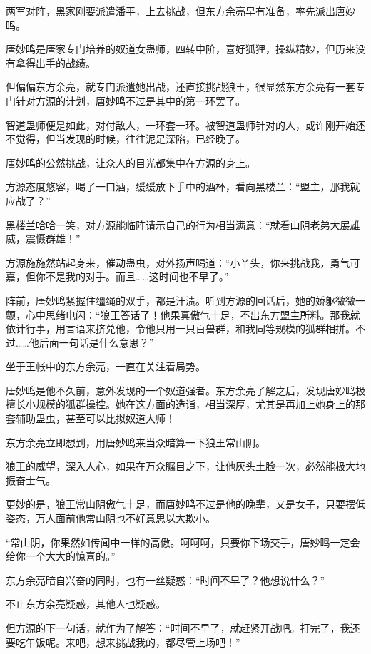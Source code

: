 
\begin{this_body}

两军对阵，黑家刚要派遣潘平，上去挑战，但东方余亮早有准备，率先派出唐妙鸣。

唐妙鸣是唐家专门培养的奴道女蛊师，四转中阶，喜好狐狸，操纵精妙，但历来没有拿得出手的战绩。

但偏偏东方余亮，就专门派遣她出战，还直接挑战狼王，很显然东方余亮有一套专门针对方源的计划，唐妙鸣不过是其中的第一环罢了。

智道蛊师便是如此，对付敌人，一环套一环。被智道蛊师针对的人，或许刚开始还不觉得，但当发现的时候，往往泥足深陷，已经晚了。

唐妙鸣的公然挑战，让众人的目光都集中在方源的身上。

方源态度悠容，喝了一口酒，缓缓放下手中的酒杯，看向黑楼兰：“盟主，那我就应战了？”

黑楼兰哈哈一笑，对方源能临阵请示自己的行为相当满意：“就看山阴老弟大展雄威，震慑群雄！”

方源施施然站起身来，催动蛊虫，对外扬声喝道：“小丫头，你来挑战我，勇气可嘉，但你不是我的对手。而且……这时间也不早了。”

阵前，唐妙鸣紧握住缰绳的双手，都是汗渍。听到方源的回话后，她的娇躯微微一颤，心中思绪电闪：“狼王答话了！他果真傲气十足，不出东方盟主所料。那我就依计行事，用言语来挤兑他，令他只用一只百兽群，和我同等规模的狐群相拼。不过……他后面一句话是什么意思？”

坐于王帐中的东方余亮，一直在关注着局势。

唐妙鸣是他不久前，意外发现的一个奴道强者。东方余亮了解之后，发现唐妙鸣极擅长小规模的狐群操控。她在这方面的造诣，相当深厚，尤其是再加上她身上的那套辅助蛊虫，甚至可以比拟奴道大师！

东方余亮立即想到，用唐妙鸣来当众暗算一下狼王常山阴。

狼王的威望，深入人心，如果在万众瞩目之下，让他灰头土脸一次，必然能极大地振奋士气。

更妙的是，狼王常山阴傲气十足，而唐妙鸣不过是他的晚辈，又是女子，只要摆低姿态，万人面前他常山阴也不好意思以大欺小。

“常山阴，你果然如传闻中一样的高傲。呵呵呵，只要你下场交手，唐妙鸣一定会给你一个大大的惊喜的。”

东方余亮暗自兴奋的同时，也有一丝疑惑：“时间不早了？他想说什么？”

不止东方余亮疑惑，其他人也疑惑。

但方源的下一句话，就作为了解答：“时间不早了，就赶紧开战吧。打完了，我还要吃午饭呢。来吧，想来挑战我的，都尽管上场吧！”


\end{this_body}
